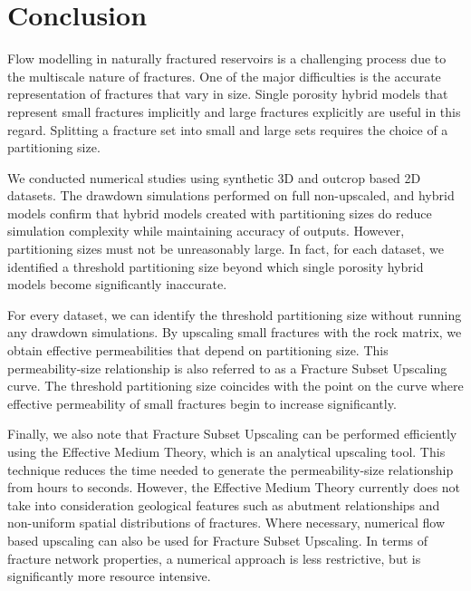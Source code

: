 \documentclass[draft]{agujournal2018}
\begin{document}
\section{Conclusion}
Flow modelling in naturally fractured reservoirs is a challenging process due to the multiscale nature of fractures. One of the major difficulties is the accurate representation of fractures that vary in size. Single porosity hybrid models that represent small fractures implicitly and large fractures explicitly are useful in this regard. Splitting a fracture set into small and large sets requires the choice of a partitioning size.

We conducted numerical studies using synthetic 3D and outcrop based 2D datasets. The drawdown simulations performed on full non-upscaled, and hybrid models confirm that hybrid models created with partitioning sizes do reduce simulation complexity while maintaining accuracy of outputs. However, partitioning sizes must not be unreasonably large. In fact, for each dataset, we identified a threshold partitioning size beyond which single porosity hybrid models become significantly inaccurate.

For every dataset, we can identify the threshold partitioning size without running any drawdown simulations. By upscaling small fractures with the rock matrix, we obtain effective permeabilities that depend on partitioning size. This permeability-size relationship is also referred to as a Fracture Subset Upscaling curve. The threshold partitioning size coincides with the point on the curve where effective permeability of small fractures begin to increase significantly. 

Finally, we also note that Fracture Subset Upscaling can be performed efficiently using the Effective Medium Theory, which is an analytical upscaling tool. This technique reduces the time needed to generate the permeability-size relationship from hours to seconds. However, the Effective Medium Theory currently does not take into consideration geological features such as abutment relationships and non-uniform spatial distributions of fractures. Where necessary, numerical flow based upscaling can also be used for Fracture Subset Upscaling. In terms of fracture network properties, a numerical approach is less restrictive, but is significantly more resource intensive.


\end{document}
